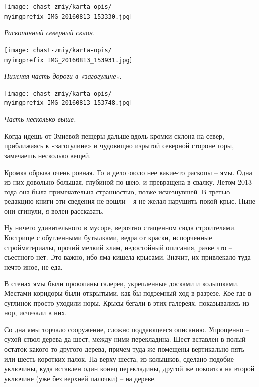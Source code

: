 \begin{center}
\texttt{[image: chast-zmiy/karta-opis/\\myimgprefix IMG\_20160813\_153330.jpg]}

\textit{Раскопанный северный склон.}
\end{center}

\newpage

\begin{center}
\texttt{[image: chast-zmiy/karta-opis/\\myimgprefix IMG\_20160813\_153931.jpg]}

\textit{Нижняя часть дороги в «загогулине».}
\end{center}

\begin{center}
\texttt{[image: chast-zmiy/karta-opis/\\myimgprefix IMG\_20160813\_153748.jpg]}

\textit{Часть несколько выше.}
\end{center}

\newpage

Когда идешь от Змиевой пещеры дальше вдоль кромки склона на север, приближаясь к «загогулине» и чудовищно изрытой северной стороне горы, замечаешь несколько вещей. 

Кромка обрыва очень ровная. То и дело около нее какие-то раскопы – ямы. Одна из них довольно большая, глубиной по шею, и превращена в свалку. Летом 2013 года она была примечательна странностью, позже исчезнувшей. В третью редакцию книги эти сведения не вошли – я не желал нарушить покой крыс. Ныне они сгинули, я волен рассказать. 

Ну ничего удивительного в мусоре, вероятно стащенном сюда строителями. Кострище с обугленными бутылками, ведра от краски, испорченные стройматериалы, прочий мелкий хлам, недостойный описания, разве что – съестного нет. Это важно, ибо яма кишела крысами. Значит, их привлекало туда нечто иное, не еда.

В стенах ямы были прокопаны галереи, укрепленные досками и колышками. Местами коридоры были открытыми, как бы подземный ход в разрезе. Кое-где в суглинок просто уходили норы. Крысы бегали в этих галереях, показывались из нор, исчезали в них.

Со дна ямы торчало сооружение, сложно поддающееся описанию. Упрощенно – сухой ствол дерева да шест, между ними перекладина. Шест  вставлен в полый остаток какого-то другого дерева, причем туда же помещены вертикально пять или шесть коротких палок. На верху шеста, из колышков, сделано подобие уключины, куда вставлен один конец перекладины, другой же покоится на второй уключине (уже без верхней палочки) – на дереве.

